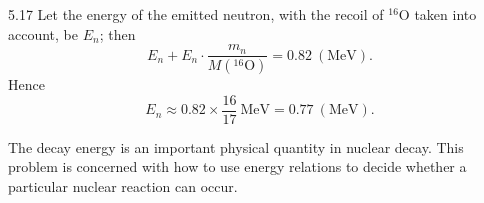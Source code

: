 \begin{solution}{5.17}
Let the energy of the emitted neutron, with the recoil of ${}^{16}\mathrm{O}$ taken into account,
be $E_n$; then
\begin{equation*}
E_n+E_n\cdot\frac{m_n}{M({}^{16}\mathrm{O})}=0.82\ (\mathrm{MeV}).
\end{equation*}
Hence
\begin{equation*}
E_n\approx 0.82\times\frac{16}{17}\ \mathrm{MeV}=0.77\ (\mathrm{MeV}).
\end{equation*}

\begin{commentary}
The decay energy is an important physical quantity in nuclear decay. This problem is concerned
with how to use energy relations to decide whether a particular nuclear reaction can occur.
\end{commentary}
\end{solution}

